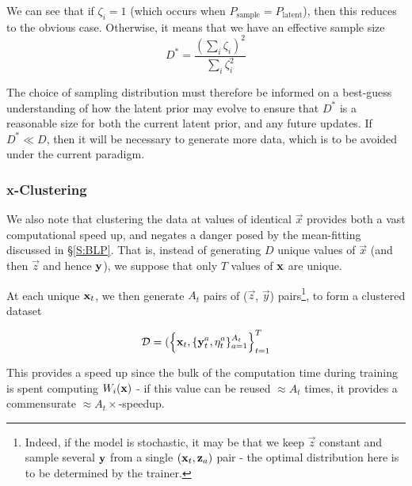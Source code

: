		We can see that if $\zeta_i = 1$ (which occurs when $P_\text{sample} = P_\text{latent}$), then this reduces to the obvious case. Otherwise, it means that we have an effective sample size
		\begin{equation}
			D^* = \frac{\left(\sum_i \zeta_i \right)^2}{\sum_i \zeta_i^2}
		\end{equation}

		The choice of sampling distribution must therefore be informed on a best-guess understanding of how the latent prior may evolve to ensure that $D^*$ is a reasonable size for both the current latent prior, and any future updates. If $D^* \ll D$, then it will be necessary to generate more data, which is to be avoided under the current paradigm.
	\subsubsection{x-Clustering}

		We also note that clustering the data at values of identical $\vec{x}$ provides both a vast computational speed up, and negates a danger posed by the mean-fitting discussed in \S\ref{S:BLP}. That is, instead of generating $D$ unique values of $\vec{x}$ (and then $\vec{z}$ and hence $\mathbf{\boldsymbol{\mathrm{y}}}$), we suppose that only $T$ values of $\mathbf{\boldsymbol{\mathrm{x}}}$ are unique.

		At each unique $\mathbf{\boldsymbol{\mathrm{x}}}_t$, we then generate $A_t$ pairs of ($\vec{z}$, $\vec{y}$) pairs\footnote{Indeed, if the model is stochastic, it may be that we keep $\vec{z}$ constant and sample several $\mathbf{\boldsymbol{\mathrm{y}}}$ from a single $(\mathbf{\boldsymbol{\mathrm{x}}}_t, \mathbf{\boldsymbol{\mathrm{z}}}_a)$ pair - the optimal distribution here is to be determined by the trainer.}, to form a clustered dataset

		\begin{equation}
			\mathcal{D} = (\left\{ \mathbf{\boldsymbol{\mathrm{x}}}_t, \{\mathbf{\boldsymbol{\mathrm{y}}}_t^a, \eta_t^a\}_{a=1}^{A_t} \right\}_{t = 1}^{T}
		\end{equation}

		This provides a speed up since the bulk of the computation time during training is spent computing $W_i(\mathbf{\boldsymbol{\mathrm{x}}})$ - if this value can be reused $\approx A_t$ times, it provides a commensurate $\approx A_t\times$-speedup.

